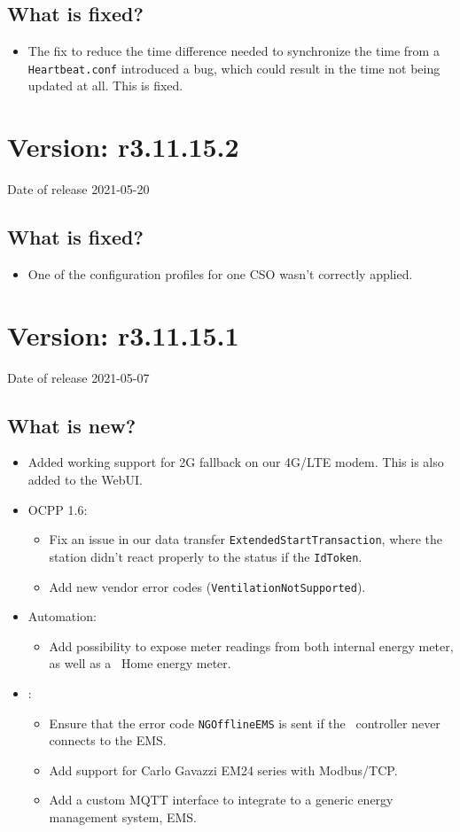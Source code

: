 \documentclass{scrartcl}
\begin{document}
\subsection*{What is fixed?}
\begin{itemize}
\item The fix to reduce the time difference needed to synchronize the time
  from a \verb|Heartbeat.conf| introduced a bug, which could result in the
  time not being updated at all. This is fixed.
\end{itemize}

\section{Version: r3.11.15.2}
Date of release 2021-05-20
\subsection*{What is fixed?}
\begin{itemize}
\item One of the configuration profiles for one CSO wasn't correctly applied.
\end{itemize}

\section{Version: r3.11.15.1}
Date of release 2021-05-07
\subsection*{What is new?}
\begin{itemize}
\item Added working support for 2G fallback on our 4G/LTE modem. This is also
  added to the WebUI.
\item OCPP 1.6:
  \begin{itemize}
  \item Fix an issue in our data transfer \verb|ExtendedStartTransaction|,
    where the station didn't react properly to the status if the \verb|IdToken|.
  \item Add new vendor error codes (\verb|VentilationNotSupported|).
  \end{itemize}
\item Automation:
  \begin{itemize}
  \item Add possibility to expose meter readings from both internal energy
    meter, as well as a \nanogrid\ Home energy meter.
  \end{itemize}
\item \nanogrid:
  \begin{itemize}
  \item Ensure that the error code \verb|NGOfflineEMS| is sent if the
    \nanogrid\ controller never connects to the EMS.
  \item Add support for Carlo Gavazzi EM24 series with Modbus/TCP.
  \item Add a custom MQTT interface to integrate to a generic energy
    management system, EMS.
  \end{itemize}
\end{itemize}
\end{document}

